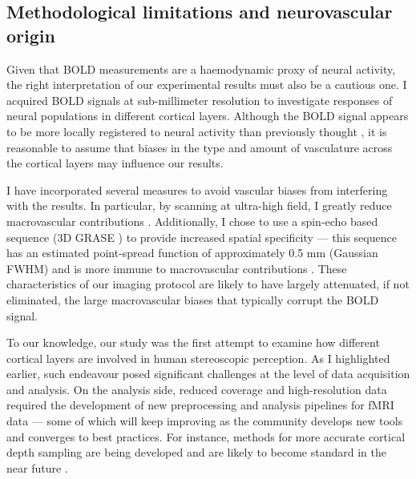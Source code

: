 \subsection{Methodological limitations and neurovascular origin}

Given that BOLD measurements are a haemodynamic proxy of neural activity, the right interpretation of our experimental results must also be a cautious one. I acquired BOLD signals at sub-millimeter resolution to investigate responses of neural populations in different cortical layers. Although the BOLD signal appears to be more locally registered to neural activity than previously thought \cite{Siero:2014it}, it is reasonable to assume that biases in the type and amount of vasculature across the cortical layers \cite{Duvernoy:1981yq} may influence our results.

I have incorporated several measures to avoid vascular biases from interfering with the results. In particular, by scanning at ultra-high field, I greatly reduce macrovascular contributions \cite{Gati:1997uq,Ogawa:1998fk,Ugurbil:2003uq}. Additionally, I chose to use a spin-echo based sequence (3D GRASE \cite{Feinberg:2008qa}) to provide increased spatial specificity --- this sequence has an estimated point-spread function of approximately 0.5 mm (Gaussian FWHM) and is more immune to macrovascular contributions \cite{DeMartino:2013qy}. These characteristics of our imaging protocol are likely to have largely attenuated, if not eliminated, the large macrovascular biases that typically corrupt the BOLD signal.

To our knowledge, our study was the first attempt to examine how different cortical layers are involved in human stereoscopic perception. As I highlighted earlier, such endeavour posed significant challenges at the level of data acquisition and analysis. On the analysis side, reduced coverage and high-resolution data required the development of new preprocessing and analysis pipelines for fMRI data --- some of which will keep improving as the community develops new tools and converges to best practices. For instance, methods for more accurate cortical depth sampling are being developed and are likely to become standard in the near future \cite{Waehnert:2013kl}.

